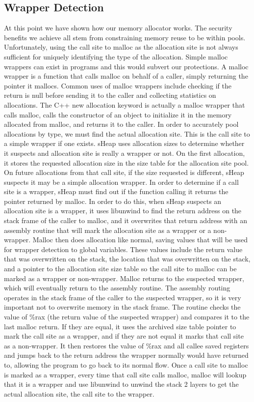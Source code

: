 \documentclass[conference]{IEEEtran}
\begin{document}
\subsection{Wrapper Detection}
At this point we have shown how our memory allocator works. The security benefits 
we achieve all stem from constraining memory reuse to be within pools. Unfortunately, 
using the call site to malloc as the allocation site is not always sufficient for 
uniquely identifying the type of the allocation. Simple malloc wrappers can exist 
in programs and this would subvert our protections. A malloc wrapper is a 
function that calls malloc on behalf of a caller, simply returning the pointer it 
mallocs. Common uses of malloc wrappers include checking if the return is null 
before sending it to the caller and collecting statistics on allocations. The C++ 
new allocation keyword is actually a malloc wrapper that calls malloc, calls the 
constructor of an object to initialize it in the memory allocated from malloc, and 
returns it to the caller. In order to accurately pool allocations by type, we must 
find the actual allocation site. This is the call site to a simple wrapper if one 
exists. sHeap uses allocation sizes to determine whether it suspects and allocation 
site is really a wrapper or not. On the first allocation, it stores the requested 
allocation size in the size table for the allocation site pool. On future 
allocations from that call site, if the size requested is different, sHeap suspects 
it may be a simple allocation wrapper. In order to determine if a call site is a 
wrapper, sHeap must find out if the function calling it returns the pointer returned 
by malloc. In order to do this, when sHeap suspects an allocation site is a wrapper, 
it uses libunwind to find the return address on the stack frame of the caller to 
malloc, and it overwrites that return address with an assembly routine that will mark 
the allocation site as a wrapper or a non-wrapper. Malloc then does allocation like 
normal, saving values that will be used for wrapper detection to global variables. 
These values include the return value that was overwritten on the stack, the location 
that was overwritten on the stack, and a pointer to the allocation site size table so 
the call site to malloc can be marked as a wrapper or non-wrapper. Malloc returns to 
the suspected wrapper, which will eventually return to the assembly routine. The 
assembly routing operates in the stack frame of the caller to the suspected wrapper, 
so it is very important not to overwrite memory in the stack frame. The routine 
checks the value of \%rax (the return value of the suspected wrapper) and compares 
it to the last malloc return. If they are equal, it uses the archived size table 
pointer to mark the call site as a wrapper, and if they are not equal it marks that 
call site as a non-wrapper. It then restores the value of \%rax and all callee saved 
registers and jumps back to the return address the wrapper normally would have 
returned to, allowing the program to go back to its normal flow. Once a call site to 
malloc is marked as a wrapper, every time that call site calls malloc, malloc will 
lookup that it is a wrapper and use libunwind to unwind the stack 2 layers to get the 
actual allocation site, the call site to the wrapper. 
\end{document}
